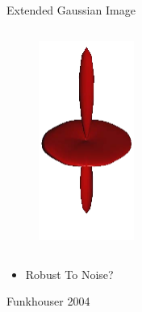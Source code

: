 \documentclass{beamer}
\begin{document}
\begin{frame}{Extended Gaussian Image}
\begin{columns}[c]
\begin{figure}[t]
    \includegraphics[width=0.5\textwidth]{EGIOrigCoffeeMug.png}
\end{figure}

\end{columns}

\begin{itemize}[label=$\vartriangleright$]

\item Robust To Noise?

\end{itemize}

\small Funkhouser 2004

\end{frame}
\end{document}
